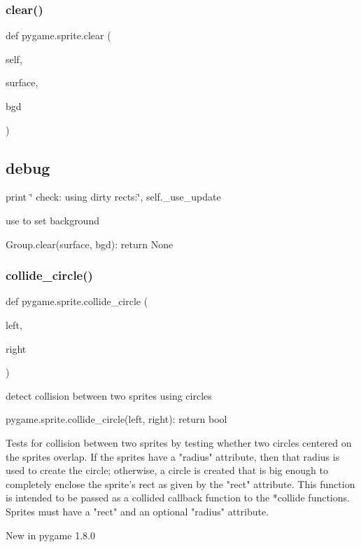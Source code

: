 \subsubsection{\texorpdfstring{clear()}{clear()}}
{\footnotesize\ttfamily def pygame.\+sprite.\+clear (\begin{DoxyParamCaption}\item[{}]{self,  }\item[{}]{surface,  }\item[{}]{bgd }\end{DoxyParamCaption})}



\subsection*{debug}

print \char`\"{}               check\+: using dirty rects\+:\char`\"{}, self.\+\_\+use\+\_\+update 

\begin{DoxyVerb}use to set background

Group.clear(surface, bgd): return None\end{DoxyVerb}
 \mbox{\label{namespacepygame_1_1sprite_a69e8ebb1118757911e5fc2931aebf494}} 
\subsubsection{\texorpdfstring{collide\+\_\+circle()}{collide\_circle()}}
{\footnotesize\ttfamily def pygame.\+sprite.\+collide\+\_\+circle (\begin{DoxyParamCaption}\item[{}]{left,  }\item[{}]{right }\end{DoxyParamCaption})}

\begin{DoxyVerb}detect collision between two sprites using circles

pygame.sprite.collide_circle(left, right): return bool

Tests for collision between two sprites by testing whether two circles
centered on the sprites overlap. If the sprites have a "radius" attribute,
then that radius is used to create the circle; otherwise, a circle is
created that is big enough to completely enclose the sprite's rect as
given by the "rect" attribute. This function is intended to be passed as
a collided callback function to the *collide functions. Sprites must have a
"rect" and an optional "radius" attribute.

New in pygame 1.8.0\end{DoxyVerb}
 \mbox{\label{namespacepygame_1_1sprite_ac070f5d4ef6163636321a2a0ba458dcb}} 
